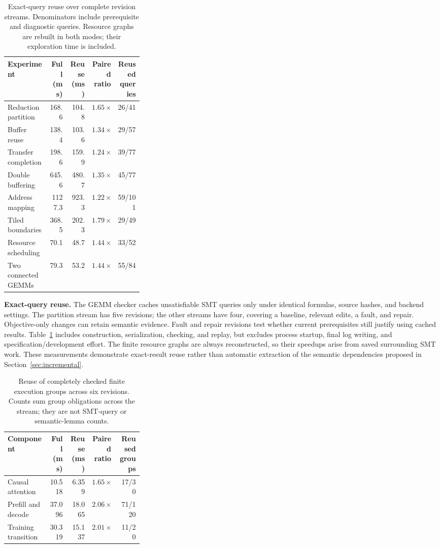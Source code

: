 \documentclass[11pt]{article}
\begin{document}
\begin{table}[ht]
\centering\small
\begin{tabular}{p{0.31\linewidth}rrrr}
\toprule
Experiment & Full (ms) & Reuse (ms) & Paired ratio & Reused queries \\
\midrule
Reduction partition & 168.6 & 104.8 & $1.65\times$ & 26/41 \\
Buffer reuse & 138.4 & 103.6 & $1.34\times$ & 29/57 \\
Transfer completion & 198.6 & 159.9 & $1.24\times$ & 39/77 \\
Double buffering & 645.6 & 480.7 & $1.35\times$ & 45/77 \\
Address mapping & 1127.3 & 923.3 & $1.22\times$ & 59/101 \\
Tiled boundaries & 368.5 & 202.3 & $1.79\times$ & 29/49 \\
Resource scheduling & 70.1 & 48.7 & $1.44\times$ & 33/52 \\
Two connected GEMMs & 79.3 & 53.2 & $1.44\times$ & 55/84 \\
\bottomrule
\end{tabular}
\caption{Exact-query reuse over complete revision streams. Denominators include prerequisite and diagnostic queries. Resource graphs are rebuilt in both modes; their exploration time is included.}\label{tab:query-reuse}
\end{table}

\textbf{Exact-query reuse.}
The GEMM checker caches unsatisfiable SMT queries only under identical formulas, source hashes, and backend settings. The partition stream has five revisions; the other streams have four, covering a baseline, relevant edits, a fault, and repair. Objective-only changes can retain semantic evidence. Fault and repair revisions test whether current prerequisites still justify using cached results. Table~\ref{tab:query-reuse} includes construction, serialization, checking, and replay, but excludes process startup, final log writing, and specification/development effort. The finite resource graphs are always reconstructed, so their speedups arise from saved surrounding SMT work. These measurements demonstrate exact-result reuse rather than automatic extraction of the semantic dependencies proposed in Section~\ref{sec:incremental}.

\begin{table}[ht]
\centering\small
\begin{tabular}{p{0.31\linewidth}rrrr}
\toprule
Component & Full (ms) & Reuse (ms) & Paired ratio & Reused groups \\
\midrule
Causal attention & 10.518 & 6.359 & $1.65\times$ & 17/30 \\
Prefill and decode & 37.096 & 18.065 & $2.06\times$ & 71/120 \\
Training transition & 30.319 & 15.137 & $2.01\times$ & 11/20 \\
\bottomrule
\end{tabular}
\caption{Reuse of completely checked finite execution groups across six revisions. Counts sum group obligations across the stream; they are not SMT-query or semantic-lemma counts.}\label{tab:workload-reuse}
\end{table}
\end{document}

